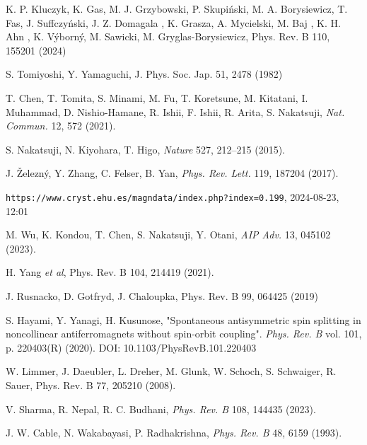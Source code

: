 \documentclass[prb,showpacs,amsmath,amssymb,superscriptaddress,twocolumn,floatfix]{revtex4-1}
\begin{document}
\begin{thebibliography}{99}
 K. P. Kluczyk, K. Gas, M. J. Grzybowski, P. Skupi\'nski, M. A. Borysiewicz, T. Fas, J. Suffczy\'nski, J. Z. Domagala , K. Grasza, A. Mycielski, M. Baj , K. H. Ahn , K. V\'yborn\'y, M. Sawicki, M. Gryglas-Borysiewicz, Phys. Rev. B 110, 155201 (2024)

 S. Tomiyoshi, Y. Yamaguchi, J. Phys. Soc. Jap. 51, 2478 (1982)

 T. Chen, T. Tomita, S. Minami, M. Fu, T. Koretsune, M. Kitatani, I. Muhammad, D. Nishio-Hamane, R. Ishii, F. Ishii, R. Arita, S. Nakatsuji, \textit{Nat. Commun.} 12, 572 (2021). %

 S. Nakatsuji, N. Kiyohara, T. Higo, \textit{Nature} 527, 212–215 (2015). %

 J. \v{Z}elezn\'y, Y. Zhang, C. Felser, B. Yan, \textit{Phys. Rev. Lett.} 119, 187204 (2017). %

\texttt{https://www.cryst.ehu.es/magndata/index.php?index=0.199}, 2024-08-23, 12:01

 M. Wu, K. Kondou, T. Chen, S. Nakatsuji, Y. Otani, \textit{AIP Adv.} 13, 045102 (2023). %

 H. Yang \textit{et al}, Phys. Rev. B 104, 214419 (2021).

 J. Rusnacko, D. Gotfryd, J. Chaloupka, Phys. Rev. B 99, 064425 (2019)

 S. Hayami, Y. Yanagi, H. Kusunose, "Spontaneous antisymmetric spin splitting in noncollinear antiferromagnets without spin-orbit coupling". \textit{Phys. Rev. B} vol. 101, p. 220403(R) (2020). DOI: 10.1103/PhysRevB.101.220403

 W. Limmer, J. Daeubler, L. Dreher, M. Glunk, W. Schoch, S. Schwaiger, R. Sauer, Phys. Rev. B 77, 205210 (2008). %


 V. Sharma, R. Nepal, R. C. Budhani, \textit{Phys. Rev. B} 108, 144435 (2023). %

 J. W. Cable, N. Wakabayasi, P. Radhakrishna, \textit{Phys. Rev. B} 48, 6159 (1993). %



\end{thebibliography}
\end{document}
